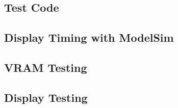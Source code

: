 \begin{appendices}
\chapter{Test Code} \label{App:testcode}

\section{Display Timing with ModelSim}


\newpage
\section{VRAM Testing}


\newpage
\section{Display Testing}


\end{appendices}
